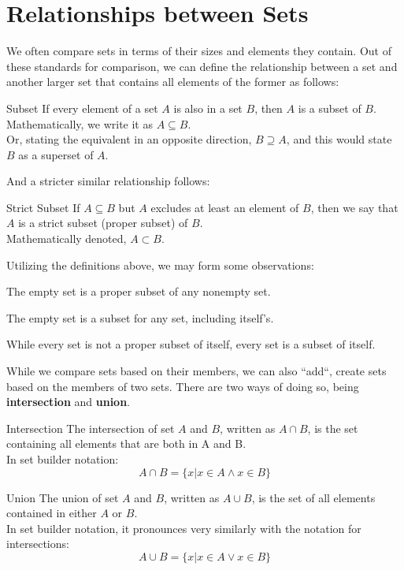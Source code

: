 \section{Relationships between Sets}
We often compare sets in terms of their sizes and elements they contain. Out of these standards for comparison, we can define the relationship between a set and another larger set that contains all elements of the former as follows:
\begin{ln-define}{Subset}{}
    If every element of a set $A$ is also in a set $B$, then $A$ is a subset of $B$. \\
    Mathematically, we write it as $A \subseteq B$. \\
    Or, stating the equivalent in an opposite direction, $B \supseteq A$, and this would state $B$ as a superset of $A$.
\end{ln-define}
And a stricter similar relationship follows:
\begin{ln-define}{Strict Subset}{}
    If $A \subseteq B$ but $A$ excludes at least an element of $B$, then we say that $A$ is a strict subset (proper subset) of $B$. \\
    Mathematically denoted, $A \subset B$.
\end{ln-define}
Utilizing the definitions above, we may form some observations:
\begin{bindenum}
    \item The empty set is a proper subset of any nonempty set.
    \item The empty set is a subset for any set, including itself's.
    \item While every set is not a proper subset of itself, every set is a subset of itself.
\end{bindenum}
While we compare sets based on their members, we can also ``add``, create sets based on the members of two sets. There are two ways of doing so, being \textbf{intersection} and \textbf{union}.
\begin{ln-define}{Intersection}{}
    The intersection of set $A$ and $B$, written as $A \cap B$, is the set containing all elements that are both in A and B. \\
    In set builder notation:
    \[A \cap B = \{x | x \in A \land x \in B\}\]
\end{ln-define}
\begin{ln-define}{Union}{}
    The union of set $A$ and $B$, written as $A \cup B$, is the set of all elements contained in either $A$ or $B$. \\
    In set builder notation, it pronounces very similarly with the notation for intersections:
    \[A \cup B = \{x | x \in A \lor x \in B\}\]
\end{ln-define}
